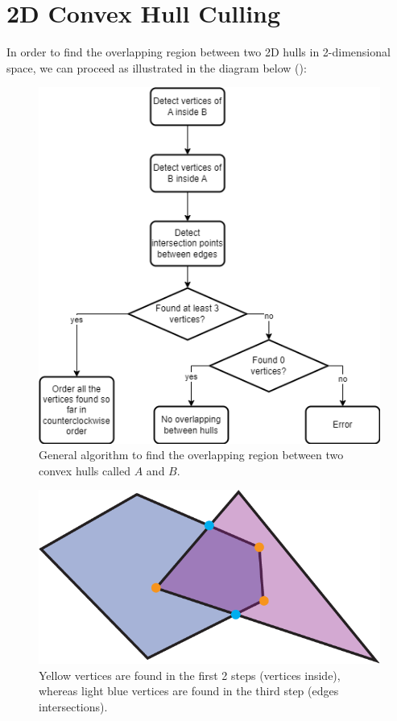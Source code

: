 \documentclass{PoliMi_MasterThesis}
\begin{document}
\section{2D Convex Hull Culling} \label{sec:2dHull_culling}
In order to find the overlapping region between two 2D hulls in 2-dimensional space, we can proceed as illustrated in the diagram below (\cite{convex_hull_culling}):

\begin{figure}[H]
    \centering
    \includegraphics[scale=0.7]{Images/hull_culling.png} 
    \caption{General algorithm to find the overlapping region between two convex hulls called $A$ and $B$.}
    \label{fig:hull_culling}
\end{figure}

\begin{figure}[H]
    \centering
    \includegraphics[scale=0.4]{Images/overlapping_hull.png} 
    \caption{Yellow vertices are found in the first 2 steps (vertices inside), whereas light blue vertices are found in the third step (edges intersections).}
    \label{fig:overlapping_hull}
\end{figure}
\end{document}
